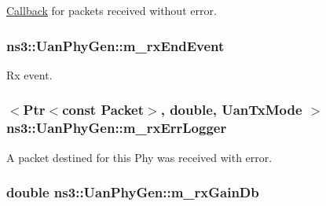 \hyperlink{classns3_1_1Callback}{Callback} for packets received without error. 

\subsubsection[{\texorpdfstring{m\+\_\+rx\+End\+Event}{m_rxEndEvent}}]{ ns3\+::\+Uan\+Phy\+Gen\+::m\+\_\+rx\+End\+Event\hspace{0.3cm}{\ttfamily [private]}}\hypertarget{classns3_1_1UanPhyGen_a6f4432c8a32e88cb4dee34c29b2f9e92}{}\label{classns3_1_1UanPhyGen_a6f4432c8a32e88cb4dee34c29b2f9e92}


Rx event. 

\subsubsection[{\texorpdfstring{m\+\_\+rx\+Err\+Logger}{m_rxErrLogger}}]{$<${\bf Ptr}$<$const {\bf Packet}$>$, double, {\bf Uan\+Tx\+Mode} $>$ ns3\+::\+Uan\+Phy\+Gen\+::m\+\_\+rx\+Err\+Logger\hspace{0.3cm}{\ttfamily [private]}}\hypertarget{classns3_1_1UanPhyGen_a31e8c081996ccafe5a8f6ceeaddd7542}{}\label{classns3_1_1UanPhyGen_a31e8c081996ccafe5a8f6ceeaddd7542}
A packet destined for this Phy was received with error. 
\subsubsection[{\texorpdfstring{m\+\_\+rx\+Gain\+Db}{m_rxGainDb}}]{\setlength{\rightskip}{0pt plus 5cm}double ns3\+::\+Uan\+Phy\+Gen\+::m\+\_\+rx\+Gain\+Db\hspace{0.3cm}{\ttfamily [private]}}\hypertarget{classns3_1_1UanPhyGen_ac90a5f64e1ac71bd0ea8b0a75e368dd0}{}\label{classns3_1_1UanPhyGen_ac90a5f64e1ac71bd0ea8b0a75e368dd0}


